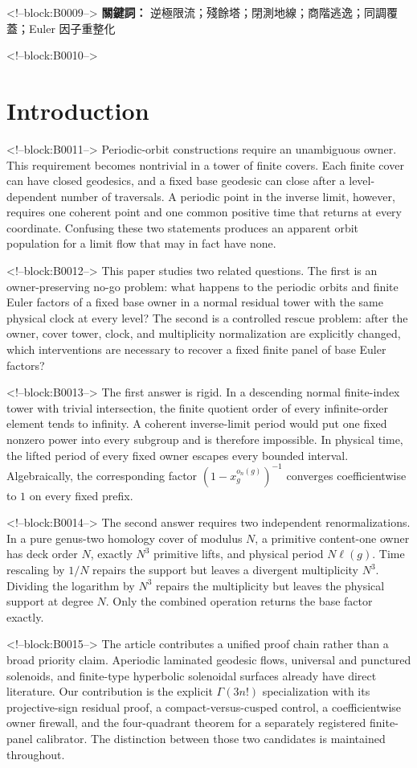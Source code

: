 \documentclass[11pt]{article}
\theoremstyle{definition}
\theoremstyle{remark}
\begin{document}
<!--block:B0009-->
\medskip
\noindent\textbf{關鍵詞：} 逆極限流；殘餘塔；閉測地線；商階逃逸；同調覆蓋；Euler 因子重整化

<!--block:B0010-->
\section{Introduction}

<!--block:B0011-->
Periodic-orbit constructions require an unambiguous owner. This requirement becomes nontrivial in a tower of finite covers. Each finite cover can have closed geodesics, and a fixed base geodesic can close after a level-dependent number of traversals. A periodic point in the inverse limit, however, requires one coherent point and one common positive time that returns at every coordinate. Confusing these two statements produces an apparent orbit population for a limit flow that may in fact have none.

<!--block:B0012-->
This paper studies two related questions. The first is an owner-preserving no-go problem: what happens to the periodic orbits and finite Euler factors of a fixed base owner in a normal residual tower with the same physical clock at every level? The second is a controlled rescue problem: after the owner, cover tower, clock, and multiplicity normalization are explicitly changed, which interventions are necessary to recover a fixed finite panel of base Euler factors?

<!--block:B0013-->
The first answer is rigid. In a descending normal finite-index tower with trivial intersection, the finite quotient order of every infinite-order element tends to infinity. A coherent inverse-limit period would put one fixed nonzero power into every subgroup and is therefore impossible. In physical time, the lifted period of every fixed owner escapes every bounded interval. Algebraically, the corresponding factor $(1-x_g^{o_n(g)})^{-1}$ converges coefficientwise to $1$ on every fixed prefix.

<!--block:B0014-->
The second answer requires two independent renormalizations. In a pure genus-two homology cover of modulus $N$, a primitive content-one owner has deck order $N$, exactly $N^3$ primitive lifts, and physical period $N\ell(g)$. Time rescaling by $1/N$ repairs the support but leaves a divergent multiplicity $N^3$. Dividing the logarithm by $N^3$ repairs the multiplicity but leaves the physical support at degree $N$. Only the combined operation returns the base factor exactly.

<!--block:B0015-->
The article contributes a unified proof chain rather than a broad priority claim. Aperiodic laminated geodesic flows, universal and punctured solenoids, and finite-type hyperbolic solenoidal surfaces already have direct literature. Our contribution is the explicit $\Gamma(3n!)$ specialization with its projective-sign residual proof, a compact-versus-cusped control, a coefficientwise owner firewall, and the four-quadrant theorem for a separately registered finite-panel calibrator. The distinction between those two candidates is maintained throughout.
\end{document}
